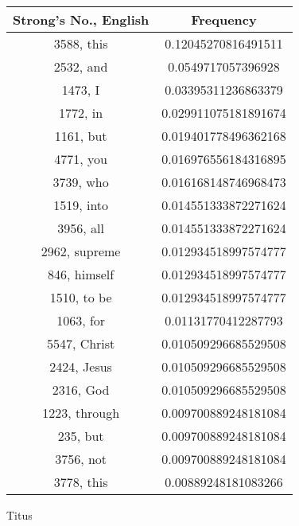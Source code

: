\documentclass[12pt,letterpaper]{article}
\begin{document}
 \begin{longtable}{|c|c|}
\hline
 Strong's No., English & Frequency \\ \hline  
3588, this & 0.12045270816491511\\ \hline 
 2532, and & 0.0549717057396928\\ \hline 
 1473, I & 0.03395311236863379\\ \hline 
 1772, in & 0.029911075181891674\\ \hline 
 1161, but & 0.019401778496362168\\ \hline 
 4771, you & 0.016976556184316895\\ \hline 
 3739, who & 0.016168148746968473\\ \hline 
 1519, into & 0.014551333872271624\\ \hline 
 3956, all & 0.014551333872271624\\ \hline 
 2962, supreme & 0.012934518997574777\\ \hline 
 846, himself & 0.012934518997574777\\ \hline 
 1510, to be & 0.012934518997574777\\ \hline 
 1063, for & 0.01131770412287793\\ \hline 
 5547, Christ & 0.010509296685529508\\ \hline 
 2424, Jesus & 0.010509296685529508\\ \hline 
 2316, God & 0.010509296685529508\\ \hline 
 1223, through & 0.009700889248181084\\ \hline 
 235, but & 0.009700889248181084\\ \hline 
 3756, not & 0.009700889248181084\\ \hline 
 3778, this & 0.00889248181083266\\ \hline 
\end{longtable} 
 

Titus
\end{document}
